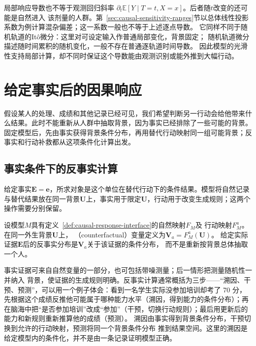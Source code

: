 局部响应导数也不等于观测回归斜率
\(\partial_t\mathbb E[Y\mid T=t,X=x]\)。后者随\(t\)改变的还可能是自然进入
该剂量的人群。第~\ref{sec:causal-sensitivity-ranges}节以总体线性投影系数为例计算混杂偏差；这一系数一般也不等于上述逐点导数。
它同样不同于随机轨道的It\^o微分：这里对可设定输入作普通局部变化，背景固定；
随机轨道微分描述随时间累积的随机变化，一般不存在普通逐轨道时间导数。
因此模型的光滑性支持局部计算，却不同时保证这个导数能由观测识别或能外推到大幅行动。

\section{给定事实后的因果响应}
\label{sec:causal-counterfactual-recourse}

假设某人的处理、成绩和其他记录已经可见，我们希望判断另一行动会给他带来什么结果。此时不能重新从人群中抽取背景，因为事实已经排除了一些可能的背景。固定模型后，先由事实获得背景条件分布，再用替代行动映射同一组可能背景；反事实和行动补救都从这项条件化计算出发。

\subsection{事实条件下的反事实计算}
\label{sec:causal-factual-counterfactual}

给定事实\(\bm E=\bm e\)，所求对象是这个单位在替代行动下的条件结果。模型将自然记录与替代结果放在同一背景\(\bm U\)上，事实用于限定\(\bm U\)，行动用于改变生成规则；这两个操作需要分别保留。

\begin{definition}[给定响应模型的反事实变量]
  \label{def:causal-counterfactual}
  设模型\(M\)具有定义~\ref{def:causal-response-interface}的自然映射\(F_M\)及
  行动映射\(F_M^a\)。在同一外生背景\(\bm U\)上，
  （counterfactual）变量定义为\(\bm V_a=F_M^a(\bm U)\)。
  给定实际证据\(\bm E\)后的反事实分布是\(\bm V_a\)关于该证据的条件分布，
  而不是重新按背景总体抽取一个人。
\end{definition}

事实证据可来自自然变量的一部分，也可包括带噪测量；后一情形把测量随机性一并纳入
背景，使证据的生成规则明确。反事实计算通常概括为三步——“溯因、干预、预测”，可以用一个例子体会：看到一名学生实际没参加培训却考了 70 分，先根据这个成绩反推他可能属于哪种能力水平（溯因，得到能力的条件分布）；再在脑海中把“是否参加培训”改成“参加”（干预，切换行动规则）；最后用更新后的能力和新规则重新推算他的成绩（预测）。
溯因由事实得到背景条件分布，干预切换到允许的行动映射，预测将同一个背景条件分布
推到结果空间。这里的溯因是给定模型内的条件化，并不是由一条记录证明模型正确。

